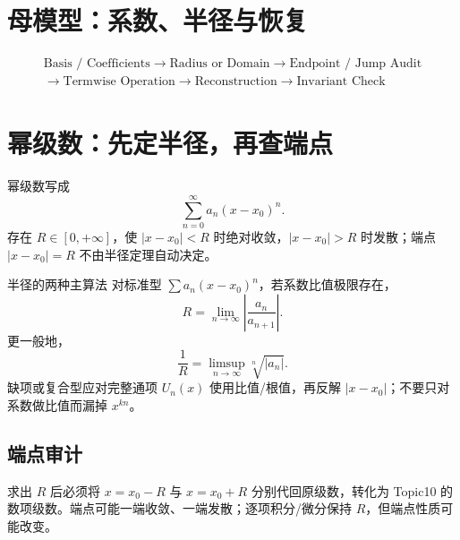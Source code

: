 \documentclass[11pt,a4paper,fontset=fandol]{ctexart}
\begin{document}
\section{母模型：系数、半径与恢复}
\[
\boxed{\begin{gathered}
\text{Basis / Coefficients}\to\text{Radius or Domain}\to\text{Endpoint / Jump Audit}\\
\to\text{Termwise Operation}\to\text{Reconstruction}\to\text{Invariant Check}
\end{gathered}}
\]
\begin{center}
\end{center}

\section{幂级数：先定半径，再查端点}
幂级数写成
\[
\sum_{n=0}^{\infty}a_n(x-x_0)^n.
\]
存在 $R\in[0,+\infty]$，使 $|x-x_0|<R$ 时绝对收敛，$|x-x_0|>R$ 时发散；端点 $|x-x_0|=R$ 不由半径定理自动决定。

\begin{methodbox}{半径的两种主算法}
对标准型 $\sum a_n(x-x_0)^n$，若系数比值极限存在，
\[
R=\lim_{n\to\infty}\left|\frac{a_n}{a_{n+1}}\right|.
\]
更一般地，
\[
\frac1R=\limsup_{n\to\infty}\sqrt[n]{|a_n|}.
\]
缺项或复合型应对完整通项 $U_n(x)$ 使用比值/根值，再反解 $|x-x_0|$；不要只对系数做比值而漏掉 $x^{kn}$。
\end{methodbox}

\subsection{端点审计}
求出 $R$ 后必须将 $x=x_0-R$ 与 $x=x_0+R$ 分别代回原级数，转化为 Topic10 的数项级数。端点可能一端收敛、一端发散；逐项积分/微分保持 $R$，但端点性质可能改变。
\end{document}
